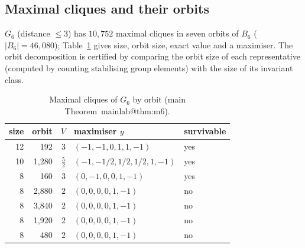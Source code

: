\documentclass[11pt,a4paper]{article}
\makeatletter
\theoremstyle{plain}
\theoremstyle{definition}
\theoremstyle{remark}
\newcommand{\mref}[1]{\csname mainlab@#1\endcsname}
\makeatother
\begin{document}
\subsection{Maximal cliques and their orbits}
$G_6$ (distance $\le3$) has $10{,}752$ maximal cliques in seven orbits of $B_6$ ($|B_6|=46{,}080$); Table~\ref{tab:S4cl} gives size, orbit size, exact value and a maximiser. The orbit decomposition is certified by comparing the orbit size of each representative (computed by counting stabilising group elements) with the size of its invariant class.
\begin{table}[H]\centering\small
\caption{Maximal cliques of $G_6$ by orbit (main Theorem~\mref{thm:m6}).}\label{tab:S4cl}
\begin{tabular}{rrrll}
\toprule
size & orbit & $V$ & maximiser $y$ & survivable\\
\midrule
12 & 192 & $3$ & $(-1,-1,0,1,1,-1)$ & yes\\
10 & 1{,}280 & $\tfrac{5}{2}$ & $(-1,-1/2,1/2,1/2,1,-1)$ & yes\\
8 & 160 & $3$ & $(0,-1,0,0,1,-1)$ & yes\\
8 & 2{,}880 & $2$ & $(0,0,0,0,1,-1)$ & no\\
8 & 3{,}840 & $2$ & $(0,0,0,0,1,-1)$ & no\\
8 & 1{,}920 & $2$ & $(0,0,0,0,1,-1)$ & no\\
8 & 480 & $2$ & $(0,0,0,0,1,-1)$ & no\\
\bottomrule
\end{tabular}
\end{table}
\end{document}
